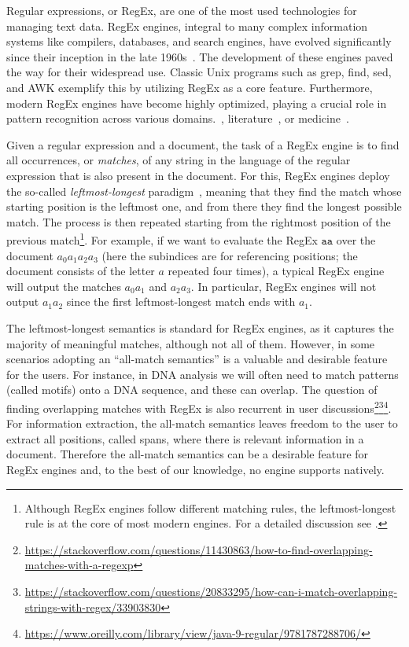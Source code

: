 
Regular expressions, or RegEx, are one of the most used technologies for
managing text data. RegEx engines, integral to many complex information systems
like compilers, databases, and search engines, have evolved significantly since
their inception in the late 1960s~\citep{thompson1968programming,earlyNFA}. The
development of these engines paved the way for their widespread use. Classic
Unix programs such as grep, find, sed, and AWK exemplify this by utilizing RegEx
as a core feature. Furthermore, modern RegEx engines have become highly
optimized, playing a crucial role in pattern recognition across various
domains.~\citep{Gonzalo}, literature~\citep{lit1}, or medicine~\citep{FloresFP21}. 


Given a regular expression and a document, the task of a RegEx engine is to find
all occurrences, or \emph{matches}, of any string in the language of the regular
expression that is also present in the document. For this, RegEx engines deploy
the so-called \emph{leftmost-longest} paradigm~\citep{posix}, meaning that they
find the match whose starting position is the leftmost one, and from there they
find the longest possible match. The process is then repeated  starting from the
rightmost position of the previous match\footnote{Although RegEx engines follow
different matching rules, the leftmost-longest rule is at the core of most
modern engines. For a detailed discussion see \citet{friedl2006mastering}.}. For
example, if we want to evaluate the RegEx $\texttt{aa}$ over the document $a_0
a_1 a_2 a_3$ (here the subindices are for referencing positions; the document
consists of the letter $a$ repeated four times), a typical RegEx engine will
output the matches $a_0a_1$ and $a_2a_3$. In particular, RegEx engines will not
output $a_1a_2$ since the first leftmost-longest match ends with $a_1$. 

The leftmost-longest semantics is standard for RegEx engines, as it captures the
majority of meaningful matches, although not all of them. However, in some
scenarios adopting an ``all-match semantics'' is a valuable and desirable
feature for the users. For instance, in DNA analysis we will often need to match
patterns (called motifs) onto a DNA sequence, and these can overlap. The
question of finding overlapping matches with RegEx is also recurrent in user
discussions\footnote{\url{https://stackoverflow.com/questions/11430863/how-to-find-overlapping-matches-with-a-regexp}}\footnote{\url{https://stackoverflow.com/questions/20833295/how-can-i-match-overlapping-strings-with-regex/33903830}}\footnote{\url{https://www.oreilly.com/library/view/java-9-regular/9781787288706/}}.
For information extraction, the
all-match semantics leaves freedom to the user to extract all positions, called
spans, where there is relevant information in a document. Therefore the
all-match semantics can be a desirable feature for RegEx engines and, to the
best of our knowledge, no engine supports natively.


